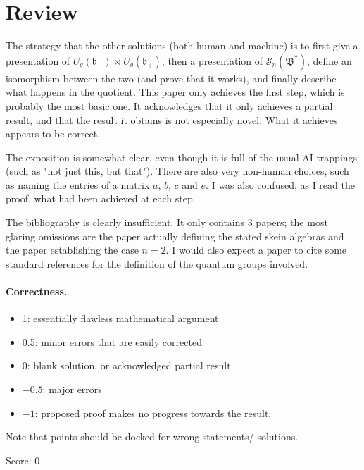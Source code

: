 \documentclass[11pt]{article}
\theoremstyle{definition}
\theoremstyle{remark}
\newcommand{\cS}{\overline{\mathscr{S}}}
\begin{document}
\maketitle

\section{Review}

The strategy that the other solutions (both human and machine) is to first give a presentation of $U_q(\mathfrak b_-)\bowtie U_q(\mathfrak b_+)$, then a presentation of $\cS_n(\mathfrak B^*)$, define an isomorphism between the two (and prove that it works), and finally describe what happens in the quotient. This paper only achieves the first step, which is probably the most basic one. It acknowledges that it only achieves a partial result, and that the result it obtains is not especially novel. What it achieves appears to be correct.

The exposition is somewhat clear, even though it is full of the usual AI trappings (such as "not just this, but that"). There are also very non-human choices, such as naming the entries of a matrix $a$, $b$, $c$ and $e$. I was also confused, as I read the proof, what had been achieved at each step.

The bibliography is clearly insufficient. It only contains 3 papers; the most glaring omissions are the paper actually defining the stated skein algebras and the paper establishing the case $n=2$. I would also expect a paper to cite some standard references for the definition of the quantum groups involved.

\paragraph{Correctness.}
\begin{itemize}
	\item  1: essentially flawless mathematical argument
	\item  0.5: minor errors that are easily corrected
	\item  0: blank solution, or acknowledged partial result
	\item  $-0.5$: major errors
	\item  $-1$: proposed proof makes no progress towards the result.
\end{itemize}
Note that points should be docked for wrong statements/ solutions.

\noindent Score: 0
\end{document}
